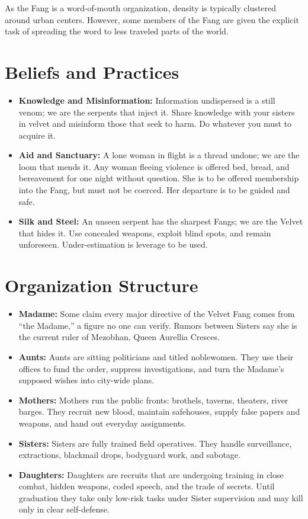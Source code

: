 \documentclass[letterpaper,twocolumn,openany,nodeprecatedcode,bg=full]{dndbook}
\begin{document}
As the Fang is a word-of-mouth organization, density is typically clustered around urban centers. However, some members of the Fang are given the explicit task of spreading the word to less traveled parts of the world.

\section*{Beliefs and Practices}
\begin{itemize}
  \item \textbf{Knowledge and Misinformation:} Information undispersed is a still venom; we are the serpents that inject it. Share knowledge with your sisters in velvet and misinform those that seek to harm. Do whatever you must to acquire it.
  \item \textbf{Aid and Sanctuary:} A lone woman in flight is a thread undone; we are the loom that mends it. Any woman fleeing violence is offered bed, bread, and bereavement for one night without question. She is to be offered membership into the Fang, but must not be coerced. Her departure is to be guided and safe.
  \item \textbf{Silk and Steel:} An unseen serpent has the sharpest Fangs; we are the Velvet that hides it. Use concealed weapons, exploit blind spots, and remain unforeseen. Under-estimation is leverage to be used.
\end{itemize}

\section*{Organization Structure}
\begin{itemize}
  \item \textbf{Madame:} Some claim every major directive of the Velvet Fang comes from “the Madame,” a figure no one can verify. Rumors between Sisters say she is the current ruler of Mezobhan, Queen Aurellia Cresces.
  \item \textbf{Aunts:} Aunts are sitting politicians and titled noblewomen. They use their offices to fund the order, suppress investigations, and turn the Madame’s supposed wishes into city-wide plans.
  \item \textbf{Mothers:} Mothers run the public fronts: brothels, taverns, theaters, river barges. They recruit new blood, maintain safehouses, supply false papers and weapons, and hand out everyday assignments.
  \item \textbf{Sisters:} Sisters are fully trained field operatives. They handle surveillance, extractions, blackmail drops, bodyguard work, and sabotage.
  \item \textbf{Daughters:} Daughters are recruits that are undergoing training in close combat, hidden weapons, coded speech, and the trade of secrets. Until graduation they take only low-risk tasks under Sister supervision and may kill only in clear self-defense.
\end{itemize}
\end{document}
